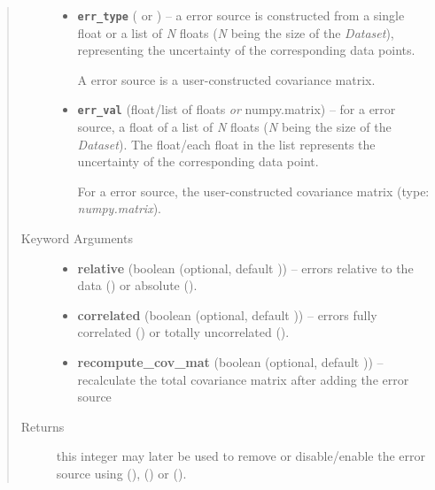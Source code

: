 \documentclass[a4paper,10pt,english]{sphinxmanual}
\begin{document}
\begin{fulllineitems}
\begin{fulllineitems}
\begin{quote}
\begin{description}
\begin{itemize}
\item {} 
\textbf{\texttt{err\_type}} ( or ) -- 
a  error source is constructed from a single float or
a list of \emph{N} floats (\emph{N} being the size of the \emph{Dataset}),
representing the uncertainty of the corresponding data points.

A  error source is a user-constructed covariance
matrix.


\item {} 
\textbf{\texttt{err\_val}} (float/list of floats \emph{or} numpy.matrix) -- 
for a  error source, a float of a list of \emph{N} floats
(\emph{N} being the size of the \emph{Dataset}). The float/each float in the
list represents the uncertainty of the corresponding data point.

For a  error source, the user-constructed covariance
matrix (type: \emph{numpy.matrix}).


\end{itemize}

\item[{Keyword Arguments}] \leavevmode\begin{itemize}
\item {} 
\textbf{relative} (boolean (optional, default )) --
errors relative to the data () or absolute ().

\item {} 
\textbf{correlated} (boolean (optional, default )) --
errors fully correlated () or totally uncorrelated
().

\item {} 
\textbf{recompute\_cov\_mat} (boolean (optional, default )) --
recalculate the total covariance matrix after adding the error
source

\end{itemize}

\item[{Returns}] \leavevmode
this integer may later be used to remove or disable/enable the
error source using
{\hyperref[index:kafe.dataset.Dataset.remove_error_source]{\emph{}}} (),
{\hyperref[index:kafe.dataset.Dataset.disable_error_source]{\emph{}}} () or
{\hyperref[index:kafe.dataset.Dataset.enable_error_source]{\emph{}}} ().


\end{description}
\end{quote}
\end{fulllineitems}
\end{fulllineitems}
\end{document}
